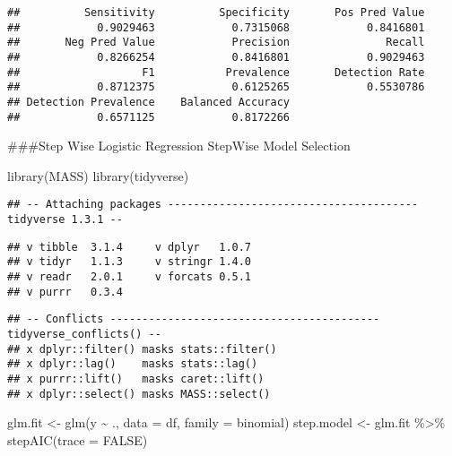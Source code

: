 \documentclass[
]{article}
\newenvironment{Shaded}{\begin{snugshade}}{\end{snugshade}}
\newcommand{\AttributeTok}[1]{\textcolor[rgb]{0.77,0.63,0.00}{#1}}
\newcommand{\ConstantTok}[1]{\textcolor[rgb]{0.00,0.00,0.00}{#1}}
\newcommand{\FunctionTok}[1]{\textcolor[rgb]{0.00,0.00,0.00}{#1}}
\newcommand{\NormalTok}[1]{#1}
\newcommand{\OtherTok}[1]{\textcolor[rgb]{0.56,0.35,0.01}{#1}}
\newcommand{\SpecialCharTok}[1]{\textcolor[rgb]{0.00,0.00,0.00}{#1}}
\begin{document}
\begin{Shaded}
\end{Shaded}

\begin{verbatim}
##          Sensitivity          Specificity       Pos Pred Value 
##            0.9029463            0.7315068            0.8416801 
##       Neg Pred Value            Precision               Recall 
##            0.8266254            0.8416801            0.9029463 
##                   F1           Prevalence       Detection Rate 
##            0.8712375            0.6125265            0.5530786 
## Detection Prevalence    Balanced Accuracy 
##            0.6571125            0.8172266
\end{verbatim}

\#\#\#Step Wise Logistic Regression StepWise Model Selection

\begin{Shaded}
\begin{Highlighting}[]
\FunctionTok{library}\NormalTok{(MASS)}
\FunctionTok{library}\NormalTok{(tidyverse)}
\end{Highlighting}
\end{Shaded}

\begin{verbatim}
## -- Attaching packages --------------------------------------- tidyverse 1.3.1 --
\end{verbatim}

\begin{verbatim}
## v tibble  3.1.4     v dplyr   1.0.7
## v tidyr   1.1.3     v stringr 1.4.0
## v readr   2.0.1     v forcats 0.5.1
## v purrr   0.3.4
\end{verbatim}

\begin{verbatim}
## -- Conflicts ------------------------------------------ tidyverse_conflicts() --
## x dplyr::filter() masks stats::filter()
## x dplyr::lag()    masks stats::lag()
## x purrr::lift()   masks caret::lift()
## x dplyr::select() masks MASS::select()
\end{verbatim}

\begin{Shaded}
\begin{Highlighting}[]
\NormalTok{glm.fit }\OtherTok{\textless{}{-}} \FunctionTok{glm}\NormalTok{(y }\SpecialCharTok{\textasciitilde{}}\NormalTok{ ., }\AttributeTok{data =}\NormalTok{ df, }\AttributeTok{family =}\NormalTok{ binomial)}
\NormalTok{step.model }\OtherTok{\textless{}{-}}\NormalTok{ glm.fit }\SpecialCharTok{\%\textgreater{}\%} \FunctionTok{stepAIC}\NormalTok{(}\AttributeTok{trace =} \ConstantTok{FALSE}\NormalTok{)}
\end{Highlighting}
\end{Shaded}
\end{document}
